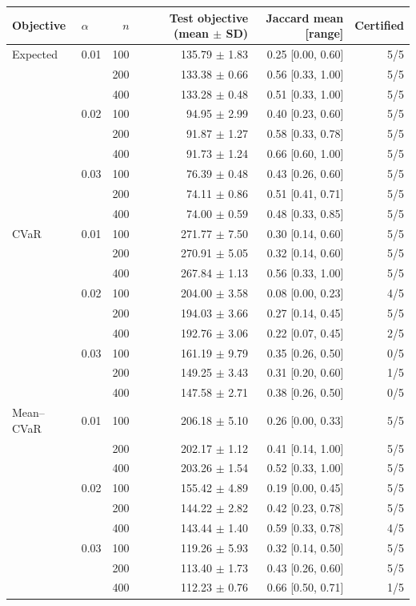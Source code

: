 \begin{tabular}{llrrrr}
\toprule
Objective & $\alpha$ & $n$ & Test objective (mean $\pm$ SD) & Jaccard mean [range] & Certified \\
\midrule
Expected & 0.01 & 100 & 135.79 $\pm$ 1.83 & 0.25 [0.00, 0.60] & 5/5 \\
 &  & 200 & 133.38 $\pm$ 0.66 & 0.56 [0.33, 1.00] & 5/5 \\
 &  & 400 & 133.28 $\pm$ 0.48 & 0.51 [0.33, 1.00] & 5/5 \\
 & 0.02 & 100 & 94.95 $\pm$ 2.99 & 0.40 [0.23, 0.60] & 5/5 \\
 &  & 200 & 91.87 $\pm$ 1.27 & 0.58 [0.33, 0.78] & 5/5 \\
 &  & 400 & 91.73 $\pm$ 1.24 & 0.66 [0.60, 1.00] & 5/5 \\
 & 0.03 & 100 & 76.39 $\pm$ 0.48 & 0.43 [0.26, 0.60] & 5/5 \\
 &  & 200 & 74.11 $\pm$ 0.86 & 0.51 [0.41, 0.71] & 5/5 \\
 &  & 400 & 74.00 $\pm$ 0.59 & 0.48 [0.33, 0.85] & 5/5 \\
\midrule
CVaR & 0.01 & 100 & 271.77 $\pm$ 7.50 & 0.30 [0.14, 0.60] & 5/5 \\
 &  & 200 & 270.91 $\pm$ 5.05 & 0.32 [0.14, 0.60] & 5/5 \\
 &  & 400 & 267.84 $\pm$ 1.13 & 0.56 [0.33, 1.00] & 5/5 \\
 & 0.02 & 100 & 204.00 $\pm$ 3.58 & 0.08 [0.00, 0.23] & 4/5 \\
 &  & 200 & 194.03 $\pm$ 3.66 & 0.27 [0.14, 0.45] & 5/5 \\
 &  & 400 & 192.76 $\pm$ 3.06 & 0.22 [0.07, 0.45] & 2/5 \\
 & 0.03 & 100 & 161.19 $\pm$ 9.79 & 0.35 [0.26, 0.50] & 0/5 \\
 &  & 200 & 149.25 $\pm$ 3.43 & 0.31 [0.20, 0.60] & 1/5 \\
 &  & 400 & 147.58 $\pm$ 2.71 & 0.38 [0.26, 0.50] & 0/5 \\
\midrule
Mean--CVaR & 0.01 & 100 & 206.18 $\pm$ 5.10 & 0.26 [0.00, 0.33] & 5/5 \\
 &  & 200 & 202.17 $\pm$ 1.12 & 0.41 [0.14, 1.00] & 5/5 \\
 &  & 400 & 203.26 $\pm$ 1.54 & 0.52 [0.33, 1.00] & 5/5 \\
 & 0.02 & 100 & 155.42 $\pm$ 4.89 & 0.19 [0.00, 0.45] & 5/5 \\
 &  & 200 & 144.22 $\pm$ 2.82 & 0.42 [0.23, 0.78] & 5/5 \\
 &  & 400 & 143.44 $\pm$ 1.40 & 0.59 [0.33, 0.78] & 4/5 \\
 & 0.03 & 100 & 119.26 $\pm$ 5.93 & 0.32 [0.14, 0.50] & 5/5 \\
 &  & 200 & 113.40 $\pm$ 1.73 & 0.43 [0.26, 0.60] & 5/5 \\
 &  & 400 & 112.23 $\pm$ 0.76 & 0.66 [0.50, 0.71] & 1/5 \\
\bottomrule
\end{tabular}

